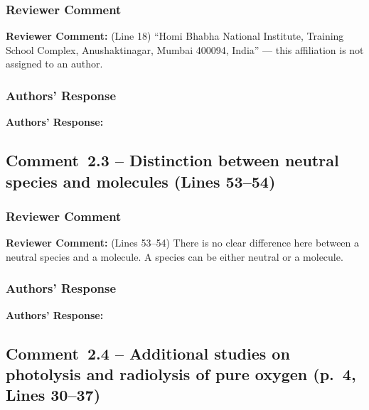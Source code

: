 \documentclass[12pt]{article}
\newcommand{\reviewlabel}{\textbf{\textcolor{commentframe}{Reviewer Comment:}}}
\newcommand{\responselabel}{\textbf{\textcolor{responseframe}{Authors' Response:}}}
\begin{document}
\subsubsection{Reviewer Comment}
\begin{reviewerbox}
\reviewlabel{} (Line 18) ``Homi Bhabha National Institute, Training School
Complex, Anushaktinagar, Mumbai 400094, India'' --- this affiliation is not
assigned to an author.
\end{reviewerbox}

\subsubsection{Authors' Response}
\begin{responsebox}
\responselabel{}

\end{responsebox}

\subsection{Comment~2.3 -- Distinction between neutral species and molecules (Lines 53--54)}

\subsubsection{Reviewer Comment}
\begin{reviewerbox}
\reviewlabel{} (Lines 53--54) There is no clear difference here between a
neutral species and a molecule. A species can be either neutral or a molecule.
\end{reviewerbox}

\subsubsection{Authors' Response}
\begin{responsebox}
\responselabel{}

\end{responsebox}

\subsection{Comment~2.4 -- Additional studies on photolysis and radiolysis of pure oxygen (p.~4, Lines 30--37)}
\end{document}
